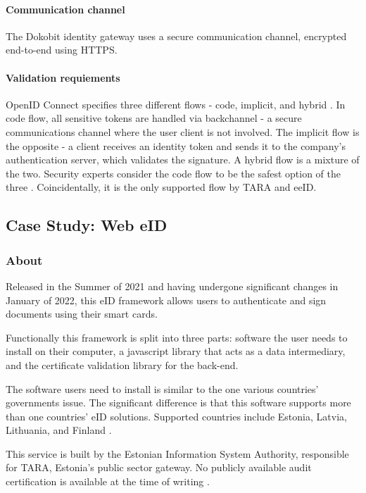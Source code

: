 \paragraph{Communication channel}

The Dokobit identity gateway uses a secure communication channel, encrypted end-to-end using HTTPS.

\paragraph{Validation requiements}

OpenID Connect specifies three different flows - code, implicit, and hybrid \cite{oidc}. In code flow, all sensitive tokens are handled via backchannel - a secure communications channel where the user client is not involved. The implicit flow is the opposite - a client receives an identity token and sends it to the company's authentication server, which validates the signature. A hybrid flow is a mixture of the two. Security experts consider the code flow to be the safest option of the three \cite{ietf-oauth-security-topics-19}. Coincidentally, it is the only supported flow by TARA and eeID.

\subsection{Case Study: Web eID}

\subsubsection{About}

Released in the Summer of 2021 \cite{ria-webeid} and having undergone significant changes in January of 2022, this eID framework allows users to authenticate and sign documents using their smart cards.

Functionally this framework is split into three parts: software the user needs to install on their computer, a javascript library that acts as a data intermediary, and the certificate validation library for the back-end.

The software users need to install is similar to the one various countries' governments issue. The significant difference is that this software supports more than one countries' eID solutions. Supported countries include Estonia, Latvia, Lithuania, and Finland \cite{ria-webeid}.

This service is built by the Estonian Information System Authority, responsible for TARA, Estonia's public sector gateway. No publicly available audit certification is available at the time of writing .

